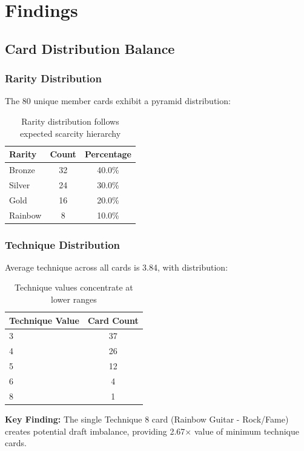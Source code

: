 \documentclass[11pt,a4paper]{article}
\begin{document}
\section{Findings}

\subsection{Card Distribution Balance}

\subsubsection{Rarity Distribution}

The 80 unique member cards exhibit a pyramid distribution:

\begin{table}[H]
\centering
\begin{tabular}{lcc}
\toprule
\textbf{Rarity} & \textbf{Count} & \textbf{Percentage} \\
\midrule
Bronze & 32 & 40.0\% \\
Silver & 24 & 30.0\% \\
Gold & 16 & 20.0\% \\
Rainbow & 8 & 10.0\% \\
\bottomrule
\end{tabular}
\caption{Rarity distribution follows expected scarcity hierarchy}
\end{table}

\subsubsection{Technique Distribution}

Average technique across all cards is 3.84, with distribution:

\begin{table}[H]
\centering
\begin{tabular}{lc}
\toprule
\textbf{Technique Value} & \textbf{Card Count} \\
\midrule
3 & 37 \\
4 & 26 \\
5 & 12 \\
6 & 4 \\
8 & 1 \\
\bottomrule
\end{tabular}
\caption{Technique values concentrate at lower ranges}
\end{table}

\textbf{Key Finding:} The single Technique 8 card (Rainbow Guitar - Rock/Fame) creates potential draft imbalance, providing 2.67$\times$ value of minimum technique cards.
\end{document}
